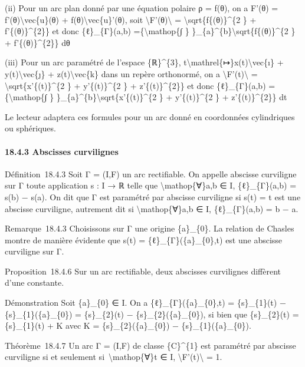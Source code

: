\documentclass[]{article}
\begin{document}
(ii) Pour un arc plan donné par une équation polaire ρ = f(θ), on a
F'(θ) = f'(θ)\textbackslash{}vec\{u\}(θ) +
f(θ)\textbackslash{}vec\{u\}'(θ), soit
\textbackslash{}\textbar{}F'(θ)\textbackslash{}\textbar{} =
\textbackslash{}sqrt\{f\{(θ)\}\^{}\{2 \} + f'\{(θ)\}\^{}\{2\}\} et donc
\{ℓ\}\_\{Γ\}(a,b) =\{\textbackslash{}mathop\{∫ \}
\}\_\{a\}\^{}\{b\}\textbackslash{}sqrt\{f\{(θ)\}\^{}\{2 \} +
f'\{(θ)\}\^{}\{2\}\} dθ

(iii) Pour un arc paramétré de l'espace \{ℝ\}\^{}\{3\},
t\textbackslash{}mathrel\{↦\}x(t)\textbackslash{}vec\{ı\} +
y(t)\textbackslash{}vec\{ȷ\} + z(t)\textbackslash{}vec\{k\} dans un
repère orthonormé, on a
\textbackslash{}\textbar{}F'(t)\textbackslash{}\textbar{} =
\textbackslash{}sqrt\{x'\{(t)\}\^{}\{2 \} + y'\{(t)\}\^{}\{2 \} +
z'\{(t)\}\^{}\{2\}\} et donc \{ℓ\}\_\{Γ\}(a,b)
=\{\textbackslash{}mathop\{∫ \}
\}\_\{a\}\^{}\{b\}\textbackslash{}sqrt\{x'\{(t)\}\^{}\{2 \} +
y'\{(t)\}\^{}\{2 \} + z'\{(t)\}\^{}\{2\}\} dt

Le lecteur adaptera ces formules pour un arc donné en coordonnées
cylindriques ou sphériques.

\paragraph{18.4.3 Abscisses curvilignes}

Définition~18.4.3 Soit Γ = (I,F) un arc rectifiable. On appelle abscisse
curviligne sur Γ toute application s : I → ℝ telle que
\textbackslash{}mathop\{∀\}a,b ∈ I, \{ℓ\}\_\{Γ\}(a,b) = s(b) − s(a). On
dit que Γ est paramétré par abscisse curviligne si s(t) = t est une
abscisse curviligne, autrement dit si \textbackslash{}mathop\{∀\}a,b ∈
I, \{ℓ\}\_\{Γ\}(a,b) = b − a.

Remarque~18.4.3 Choisissons sur Γ une origine \{a\}\_\{0\}. La relation
de Chasles montre de manière évidente que s(t) =
\{ℓ\}\_\{Γ\}(\{a\}\_\{0\},t) est une abscisse curviligne sur Γ.

Proposition~18.4.6 Sur un arc rectifiable, deux abscisses curvilignes
diffèrent d'une constante.

Démonstration Soit \{a\}\_\{0\} ∈ I. On a \{ℓ\}\_\{Γ\}(\{a\}\_\{0\},t) =
\{s\}\_\{1\}(t) − \{s\}\_\{1\}(\{a\}\_\{0\}) = \{s\}\_\{2\}(t) −
\{s\}\_\{2\}(\{a\}\_\{0\}), si bien que \{s\}\_\{2\}(t) =
\{s\}\_\{1\}(t) + K avec K = \{s\}\_\{2\}(\{a\}\_\{0\}) −
\{s\}\_\{1\}(\{a\}\_\{0\}).

Théorème~18.4.7 Un arc Γ = (I,F) de classe \{C\}\^{}\{1\} est paramétré
par abscisse curviligne si et seulement si~\textbackslash{}mathop\{∀\}t
∈ I, \textbackslash{}\textbar{}F'(t)\textbackslash{}\textbar{} = 1.
\end{document}
